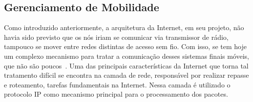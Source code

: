 \documentclass[	12pt, Times, openright, twoside, a4paper, english, brazil]{abntex2}
\begin{document}
\subsection{Gerenciamento de Mobilidade}


Como introduzido anteriormente, a arquitetura da Internet, em seu projeto, não havia sido previsto que os nós iriam se comunicar via transmissor de rádio, tampouco se mover entre redes distintas de acesso sem fio. Com isso, se tem hoje um complexo mecanismo para tratar a comunicação desses sistemas finais móveis, que não são poucos~\cite{CISCO2017}. Uma das principais características da Internet que torna tal tratamento difícil se encontra na camada de rede,  responsável por realizar repasse e roteamento, tarefas fundamentais na Internet. Nessa camada é utilizado o protocolo IP como mecanismo principal para o processamento dos pacotes. 
\end{document}
